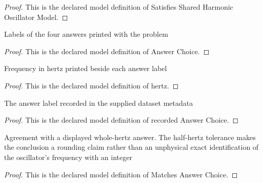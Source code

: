 \begin{proof}
  This is the declared model definition of Satisfies Shared Harmonic Oscillator Model.
\end{proof}
\begin{definition}
  \label{def:physics:phyx-mini-0200:phyxminiproblems-problemphyxmini0200-answerchoice}
  Labels of the four answers printed with the problem
\end{definition}
\begin{proof}
  This is the declared model definition of Answer Choice.
\end{proof}
\begin{definition}[hertz]
  \label{def:physics:phyx-mini-0200:phyxminiproblems-problemphyxmini0200-answerchoice-hertz}
  Frequency in hertz printed beside each answer label
\end{definition}
\begin{proof}
  This is the declared model definition of hertz.
\end{proof}
\begin{definition}
  \label{def:physics:phyx-mini-0200:phyxminiproblems-problemphyxmini0200-recordedanswerchoice}
  The answer label recorded in the supplied dataset metadata
\end{definition}
\begin{proof}
  This is the declared model definition of recorded Answer Choice.
\end{proof}
\begin{definition}
  \label{def:physics:phyx-mini-0200:phyxminiproblems-problemphyxmini0200-matchesanswerchoice}
  Agreement with a displayed whole-hertz answer. The half-hertz tolerance makes the conclusion a rounding claim rather than an unphysical exact identification of the oscillator's frequency with an integer
\end{definition}
\begin{proof}
  This is the declared model definition of Matches Answer Choice.
\end{proof}
